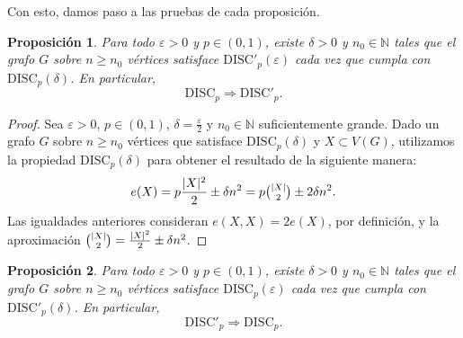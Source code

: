 \documentclass{article}[14pts]
\newtheorem{prop}{Proposición}
\newcommand{\disc}{\mathrm{DISC}}
\newcommand{\discp}{\mathrm{DISC'}}
\let\varepsilon=\varepsilon
\begin{document}
Con esto, damos paso a las pruebas de cada proposición.\medskip

\begin{prop} \label{disc => discp}
    Para todo $\varepsilon > 0$ y $p\in(0,1)$, existe $\delta > 0$ y $n_0\in\mathbb{N}$ tales que el grafo $G$ sobre $n\geq n_0$ vértices satisface $\discp_p (\varepsilon)$ cada vez que cumpla con $\disc_p (\delta)$. En particular, 
    \[
        \disc_p \Rightarrow \discp_p.
    \]
\end{prop}

\begin{proof}
    Sea $\varepsilon > 0$, $p\in (0,1)$, $\delta = \frac{\varepsilon}{2}$ y $n_0 \in \mathbb{N}$ suficientemente grande. Dado un grafo $G$ sobre $n\geq n_0$ vértices que satisface $\disc_p(\delta)$ y $X\subset V(G)$, utilizamos la propiedad $\disc_p(\delta)$ para obtener el resultado de la siguiente manera:
    \[
        e(X) = p\dfrac{|X|^{2}}{2} \pm \delta n^{2} = p\tbinom{|X|}{2} \pm 2\delta n^{2}.
    \]
    Las igualdades anteriores consideran $e(X,X) = 2e(X)$, por definición, y la aproximación  $\tbinom{|X|}{2}= \frac{|X|^2}{2} \pm \delta n^2$.
\end{proof}\medskip

\begin{prop} \label{discp => disc}
    Para todo $\varepsilon > 0$ y $p\in(0,1)$, existe $\delta > 0$ y $n_0\in\mathbb{N}$ tales que el grafo $G$ sobre $n\geq n_0$ vértices satisface $\disc_p (\varepsilon)$ cada vez que cumpla con $\discp_p (\delta)$. En particular,
    \[
        \discp_p \Rightarrow \disc_p.
    \]
\end{prop}
\end{document}
